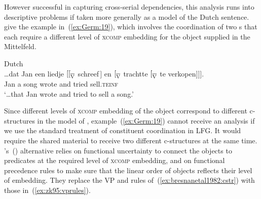 \documentclass[output=paper,hidelinks]{langscibook}
\begin{document}
However successful in capturing cross-serial dependencies, this
analysis runs into descriptive problems if taken more generally as a
model of the Dutch sentence. \citet{zaenen-kaplan1995} give the
example in~(\ref{ex:Germ:19}), which involves the coordination of two s that
each require a different level of \textsc{xcomp} embedding for the
object supplied in the Mittelfeld.

\pagebreak
\begin{exe}
  \ex\label{ex:Germ:19} Dutch \citep[§2.3, example~9]{zaenen-kaplan1995}\\
  \gll \ldots{}dat Jan een liedje {$[ [_{\BAR{\scriptsize V}}$ schreef$\,]$} en {$[_{\BAR{\scriptsize V}}$ trachtte} {$[_{\BAR{\scriptsize V}}$ te verkopen$]]]$.}\\
       \phantom{\ldots}\COMP{} Jan a song \phantom{$[ [_{\BAR{\scriptsize V}}$ }wrote and \phantom{$[_{\BAR{\scriptsize V}}$ }tried \phantom{$[_{\BAR{\scriptsize V}}$}sell\textsc{.teinf}\\
      
      \glt `\ldots that Jan wrote and tried to sell a song.'
\end{exe}
%
Since different levels of \textsc{xcomp} embedding of the object
correspond to different c-structures in the model of
\citet{BKPZ:Dutch}, example~(\ref{ex:Germ:19}) cannot receive an analysis if we use the standard treatment of constituent coordination in LFG. It would
require the shared material to receive two different c-structures at
the same
time. \citeauthor{zaenen-kaplan1995}'s~(\citeyear{zaenen-kaplan1995})
alternative relies on functional uncertainty to connect the objects to
predicates at the required level of \textsc{xcomp} embedding, and on
functional precedence rules to make sure that the linear order of
objects reflects their level of embedding. They replace the
VP and  rules of~(\ref{ex:bresnanetal1982:cstr}) with those
in~(\ref{ex:zk95:vprules}).
\end{document}
